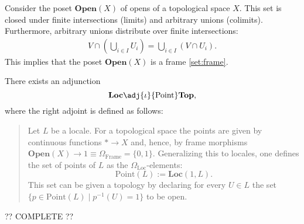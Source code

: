     \begin{property}
        Consider the poset $\mathbf{Open}(X)$ of opens of a topological space $X$. This set is closed under finite intersections (limits) and arbitrary unions (colimits). Furthermore, arbitrary unions distribute over finite intersections:
        \begin{gather}
            V\cap\left(\bigcup_{i\in I}U_i\right) = \bigcup_{i\in I}\left(V\cap U_i\right).
        \end{gather}
        This implies that the poset $\mathbf{Open}(X)$ is a frame \ref{set:frame}.
    \end{property}

    \begin{construct}
        There exists an adjunction \[\mathbf{Loc}\adj{\iota}{\mathrm{Point}}\mathbf{Top},\] where the right adjoint is defined as follows:
        \begin{quote}
            Let $L$ be a locale. For a topological space the points are given by continuous functions $\ast\rightarrow X$ and, hence, by frame morphisms $\mathbf{Open}(X)\rightarrow1\equiv\Omega_{\mathrm{Frame}}=\{0, 1\}$. Generalizing this to locales, one defines the set of points of $L$ as the $\Omega_\mathrm{Loc}$-elements: \[\mathrm{Point}(L) := \mathbf{Loc}(1,L).\] This set can be given a topology by declaring for every $U\in L$ the set $\{p\in\mathrm{Point}(L)\mid p^{-1}(U) = 1\}$ to be open.
        \end{quote}
    \end{construct}


    ?? COMPLETE ??